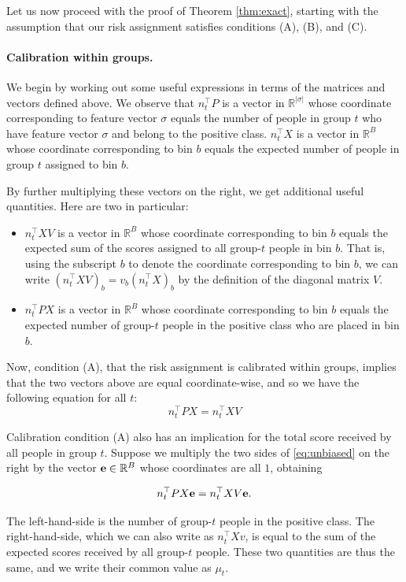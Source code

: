 \documentclass[11pt]{article}
\newcommand{\xhdr}[1]{\vspace{-0.2in} \paragraph*{\bf {#1}.}}
\def\R{\mathbb{R}}
\def\tran{^{\top}}
\def\s{|\sigma|}
\def\ones{{\bf e}}
\begin{document}
Let us now proceed with the proof of Theorem \ref{thm:exact},
starting with the assumption that
our risk assignment satisfies conditions
(A), (B), and (C).

\xhdr{Calibration within groups}
We begin by working out some useful expressions in terms of the
matrices and vectors defined above.
We observe that $n_t\tran P$ is a vector in $\R^{\s}$ whose coordinate
corresponding to feature vector $\sigma$ 
equals the number of people 
in group $t$ who have feature vector $\sigma$ and belong to the positive class.
$n_t\tran X$ is a vector in $\R^B$ whose coordinate
corresponding to bin $b$ equals the expected number of people
in group $t$ assigned to bin $b$.

By further multiplying these vectors on the right, we get additional
useful quantities.  Here are two in particular:
\begin{itemize}
\item $n_t\tran X V$ is a vector in $\R^B$ whose coordinate corresponding
to bin $b$ equals the expected sum of the scores assigned to all group-$t$
people in bin $b$.  
That is, using the subscript $b$ to denote the coordinate corresponding
to bin $b$, we can write
$(n_t\tran X V)_b = v_b (n_t\tran X)_b$
by the definition of the diagonal matrix $V$.
\item $n_t\tran P X$ is a vector in $\R^B$ whose coordinate corresponding
to bin $b$ equals the expected number of group-$t$ people in the positive 
class who are placed in bin $b$.  
\end{itemize}

Now, condition (A), that the risk assignment is calibrated within groups,
implies that the two vectors above are equal coordinate-wise, and so we have
the following equation for all $t$:
\begin{equation}
  n_t\tran PX = n_t\tran XV
  \label{eq:unbiased}
\end{equation}

Calibration condition (A) also has an implication for the 
total score received by all people in group $t$.
Suppose we multiply the two sides of \eqref{eq:unbiased} on the right
by the vector $\ones \in \R^B$ whose coordinates are all $1$, obtaining

\begin{equation}
n_t\tran PX \ones = n_t\tran XV \ones.
\label{eq:unbiased-sum}
\end{equation}

The left-hand-side is the number of group-$t$ people in the positive
class.  The right-hand-side, which we can also write as
$n_t\tran X v$, is equal to the sum of the expected scores received by all 
group-$t$ people.
These two quantities are thus the same, and we write their common value
as $\mu_t$.
\end{document}
